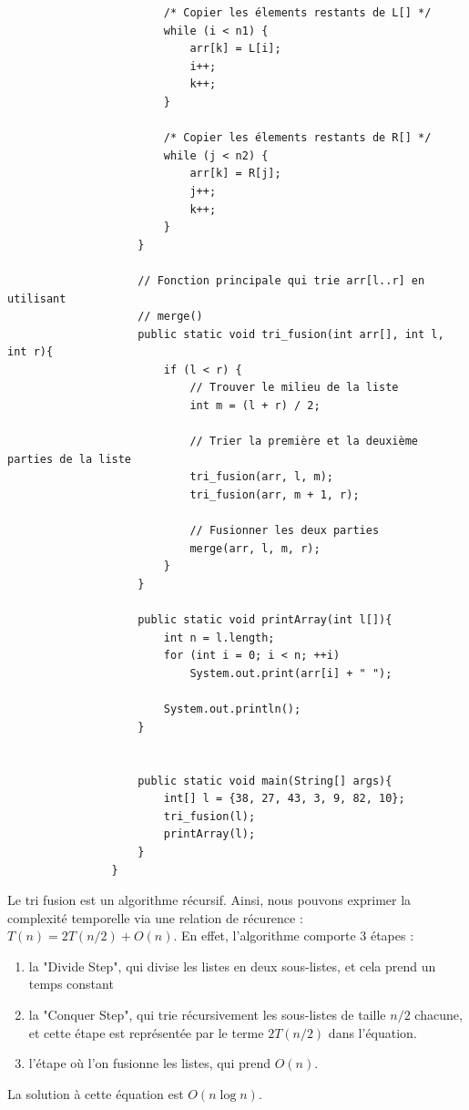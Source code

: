 \begin{Exercice} [30 minutes]
\begin{verbatim}
                        /* Copier les élements restants de L[] */
                        while (i < n1) { 
                            arr[k] = L[i]; 
                            i++; 
                            k++; 
                        } 
                  
                        /* Copier les élements restants de R[] */
                        while (j < n2) { 
                            arr[k] = R[j]; 
                            j++; 
                            k++; 
                        }  
                    }
                    
                    // Fonction principale qui trie arr[l..r] en utilisant 
                    // merge() 
                    public static void tri_fusion(int arr[], int l, int r){
                        if (l < r) { 
                            // Trouver le milieu de la liste
                            int m = (l + r) / 2; 
                  
                            // Trier la première et la deuxième parties de la liste
                            tri_fusion(arr, l, m); 
                            tri_fusion(arr, m + 1, r); 
                  
                            // Fusionner les deux parties
                            merge(arr, l, m, r); 
                        } 
                    }
                    
                    public static void printArray(int l[]){ 
                        int n = l.length; 
                        for (int i = 0; i < n; ++i) 
                            System.out.print(arr[i] + " "); 
                  
                        System.out.println(); 
                    } 
          
                    
                    public static void main(String[] args){
                        int[] l = {38, 27, 43, 3, 9, 82, 10};
                        tri_fusion(l);
                        printArray(l);
                    }
                }
        \end{verbatim}
        
        Le tri fusion est un algorithme récursif. Ainsi, nous pouvons exprimer la complexité temporelle via une relation de récurence : $T(n) = 2T(n/2) + O(n)$. En effet, l'algorithme comporte 3 étapes :
        \begin{enumerate}
            \item la "Divide Step", qui divise les listes en deux sous-listes, et cela prend un temps constant
            \item la "Conquer Step", qui trie récursivement les sous-listes de taille $n/2$ chacune, et cette étape est représentée par le terme $2T(n/2)$ dans l'équation.
            \item l'étape où l'on fusionne les listes, qui prend $O(n)$.
        \end{enumerate}
        La solution à cette équation est $O(n \log n)$.
\end{Exercice}


